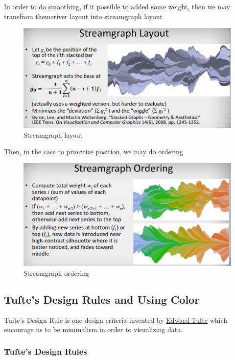 \documentclass[11pt]{article}
\makeatletter
\def\maxwidth{\ifdim\Gin@nat@width>\linewidth\linewidth
    \else\Gin@nat@width\fi}
\let\Oldincludegraphics\includegraphics
\renewcommand{\includegraphics}[1]{\Oldincludegraphics[width=.8\maxwidth]{#1}}
\makeatother
\begin{document}
In order to do smoothing, if it possible to added some weight, then we
may transfrom themeriver layout into streamgraph layout

\begin{figure}
\centering
\includegraphics{images/streamgraph-layout.png}
\caption{Streamgraph layout}
\end{figure}

Then, in the case to prioritize position, we may do ordering

\begin{figure}
\centering
\includegraphics{images/streamgraph-ordering.png}
\caption{Streamgraph ordering}
\end{figure}

    \subsection{Tufte's Design Rules and Using
Color}\label{tuftes-design-rules-and-using-color}

Tufte's Design Rule is one design criteria invented by
\href{https://www.edwardtufte.com/tufte/}{Edward Tufte} which encourage
us to be minimalism in order to visualizing data.

    \subsubsection{Tufte's Design Rules}\label{tuftes-design-rules}
\end{document}
